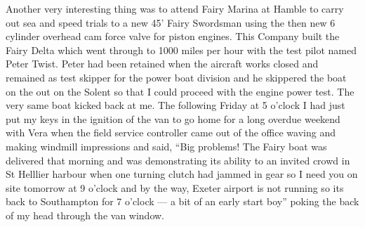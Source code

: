 Another very interesting thing was to attend Fairy Marina at Hamble to carry out
sea and speed trials to a new 45' Fairy Swordsman using the then new 6 cylinder
overhead cam force valve for piston engines. This Company built the Fairy Delta
which went through to 1000 miles per hour with the test pilot named Peter
Twist. Peter had been retained when the aircraft works closed and remained as
test skipper for the power boat division and he skippered the boat on the out
on the Solent so that I could proceed with the engine power test. The very same
boat kicked back at me. The following Friday at 5 o'clock I had just put my
keys in the ignition of the van to go home for a long overdue weekend with Vera
when the field service controller came out of the office waving and making
windmill impressions and said, ``Big problems! The Fairy boat was delivered
that morning and was demonstrating its ability to an invited crowd in St
Helllier harbour when one turning clutch had jammed in gear so I need you on
site tomorrow at 9 o'clock and by the way, Exeter airport is not running so its
back to Southampton for 7 o'clock --- a bit of an early start boy'' poking the
back of my head through the van window.
